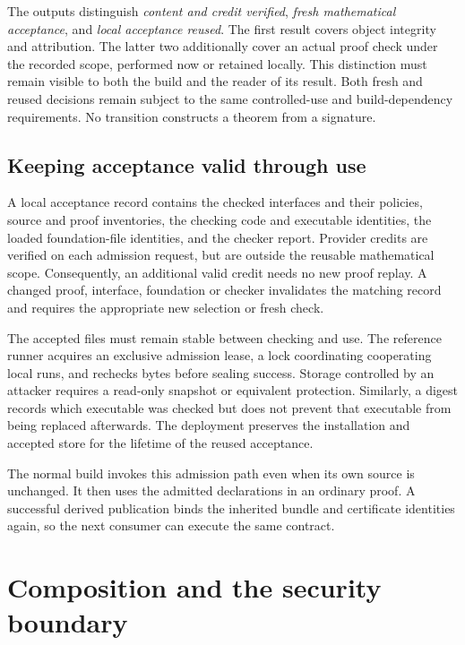 \documentclass[11pt]{article}
\begin{document}
The outputs distinguish \emph{content and credit verified}, \emph{fresh
mathematical acceptance}, and \emph{local acceptance reused}. The first result
covers object integrity and attribution. The latter two additionally cover an
actual proof check under the recorded scope, performed now or retained locally.
This distinction must remain visible to both the build and the reader of its
result. Both fresh and reused decisions remain subject to the same controlled-use
and build-dependency requirements. No transition constructs a theorem from a signature.

\subsection{Keeping acceptance valid through use}

A local acceptance record contains the checked interfaces and their policies,
source and proof inventories, the checking code and executable identities, the
loaded foundation-file identities, and the checker report. Provider credits
are verified on each admission request, but are outside the reusable
mathematical scope. Consequently, an additional valid credit needs no new proof
replay. A changed proof, interface, foundation or checker invalidates the
matching record and requires the appropriate new selection or fresh check.

The accepted files must remain stable between checking and use. The reference
runner acquires an exclusive admission lease, a lock coordinating cooperating
local runs, and rechecks bytes before sealing success. Storage controlled by
an attacker requires a read-only snapshot or equivalent protection. Similarly,
a digest records which executable was checked but does not prevent that
executable from being replaced afterwards. The deployment preserves the
installation and accepted store for the lifetime of the reused acceptance.

The normal build invokes this admission path even when its own source is
unchanged. It then uses the admitted declarations in an ordinary proof. A
successful derived publication binds the inherited bundle and certificate
identities again, so the next consumer can execute the same contract.

\vspace{0pt}
\section{Composition and the security boundary}
\end{document}
